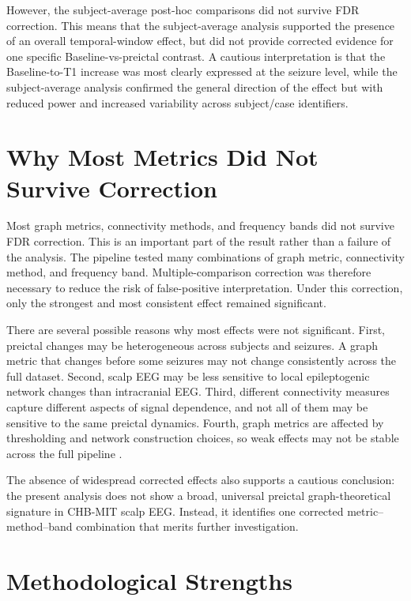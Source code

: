 However, the subject-average post-hoc comparisons did not survive FDR
correction. This means that the subject-average analysis supported the presence
of an overall temporal-window effect, but did not provide corrected evidence for
one specific Baseline-vs-preictal contrast. A cautious interpretation is that
the Baseline-to-T1 increase was most clearly expressed at the seizure level,
while the subject-average analysis confirmed the general direction of the
effect but with reduced power and increased variability across subject/case
identifiers.

\section{Why Most Metrics Did Not Survive Correction}
\label{sec:discussion-nonsignificant-results}

Most graph metrics, connectivity methods, and frequency bands did not survive
FDR correction. This is an important part of the result rather than a failure of
the analysis. The pipeline tested many combinations of graph metric,
connectivity method, and frequency band. Multiple-comparison correction was
therefore necessary to reduce the risk of false-positive interpretation. Under
this correction, only the strongest and most consistent effect remained
significant.

There are several possible reasons why most effects were not significant. First,
preictal changes may be heterogeneous across subjects and seizures. A graph
metric that changes before some seizures may not change consistently across the
full dataset. Second, scalp EEG may be less sensitive to local epileptogenic
network changes than intracranial EEG. Third, different connectivity measures
capture different aspects of signal dependence, and not all of them may be
sensitive to the same preictal dynamics. Fourth, graph metrics are affected by
thresholding and network construction choices, so weak effects may not be
stable across the full pipeline \cite{VanWijk2010,Garrison2015,Adamovich2022}.

The absence of widespread corrected effects also supports a cautious conclusion:
the present analysis does not show a broad, universal preictal graph-theoretical
signature in CHB-MIT scalp EEG. Instead, it identifies one corrected
metric--method--band combination that merits further investigation.

\section{Methodological Strengths}
\label{sec:discussion-strengths}

